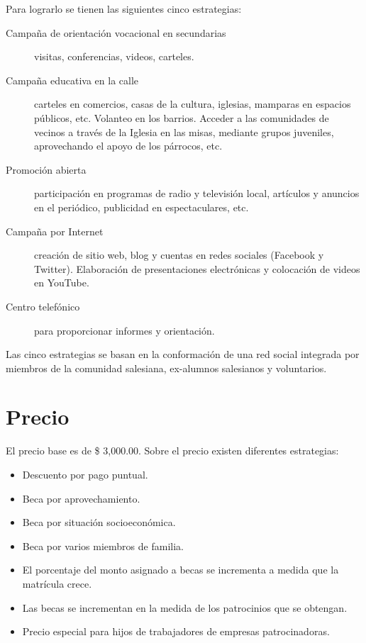 Para lograrlo se tienen las siguientes cinco estrategias:

\begin{description}
	\item[Campaña de orientación vocacional en secundarias] visitas, conferencias, videos, carteles.
	\item[Campaña educativa en la calle] carteles en comercios, casas de la cultura, iglesias, mamparas en espacios públicos, etc. Volanteo en los barrios. Acceder a las comunidades de vecinos a través de la Iglesia en las misas, mediante grupos juveniles, aprovechando el apoyo de los párrocos, etc.
	\item[Promoción abierta] participación en programas de radio y televisión local, artículos y anuncios en el periódico, publicidad en espectaculares, etc.
	\item[Campaña por Internet] creación de sitio web, blog y cuentas en redes sociales (Facebook y Twitter). Elaboración de presentaciones electrónicas y colocación de videos en YouTube.
	\item[Centro telefónico] para proporcionar informes y orientación.
\end{description}

Las cinco estrategias se basan en la conformación de una red social integrada por miembros de la comunidad salesiana, ex-alumnos salesianos y voluntarios.

\section{Precio}

El precio base es de \$ 3,000.00. Sobre el precio existen diferentes estrategias:

\begin{itemize}
	\item Descuento por pago puntual.
	\item Beca por aprovechamiento.
	\item Beca por situación socioeconómica.
	\item Beca por varios miembros de familia.
	\item El porcentaje del monto asignado a becas se incrementa a medida que la matrícula crece.
	\item Las becas se incrementan en la medida de los patrocinios que se obtengan.
	\item Precio especial para hijos de trabajadores de empresas patrocinadoras.
\end{itemize}
